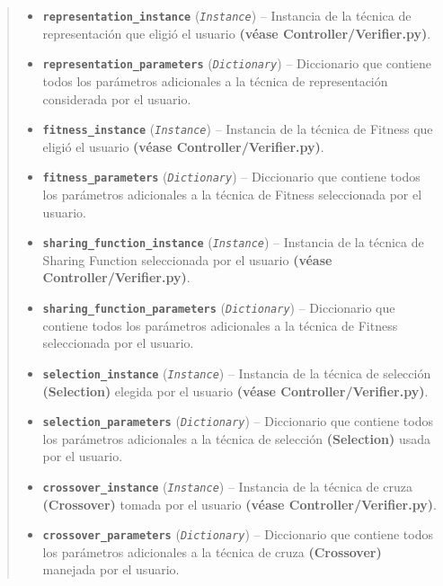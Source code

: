 \documentclass[letterpaper,10pt,english]{sphinxmanual}
\begin{document}
\begin{fulllineitems}
\begin{quote}
\begin{description}
\begin{itemize}
\item {} 
\textbf{\texttt{representation\_instance}} (\emph{\texttt{Instance}}) -- Instancia de la técnica de representación que eligió el usuario
\textbf{(véase Controller/Verifier.py)}.

\item {} 
\textbf{\texttt{representation\_parameters}} (\emph{\texttt{Dictionary}}) -- Diccionario que contiene todos los parámetros adicionales a la técnica
de representación considerada por el usuario.

\item {} 
\textbf{\texttt{fitness\_instance}} (\emph{\texttt{Instance}}) -- Instancia de la técnica de Fitness que eligió el usuario
\textbf{(véase Controller/Verifier.py)}.

\item {} 
\textbf{\texttt{fitness\_parameters}} (\emph{\texttt{Dictionary}}) -- Diccionario que contiene todos los parámetros adicionales a la técnica
de Fitness seleccionada por el usuario.

\item {} 
\textbf{\texttt{sharing\_function\_instance}} (\emph{\texttt{Instance}}) -- Instancia de la técnica de Sharing Function seleccionada por el usuario
\textbf{(véase Controller/Verifier.py)}.

\item {} 
\textbf{\texttt{sharing\_function\_parameters}} (\emph{\texttt{Dictionary}}) -- Diccionario que contiene todos los parámetros adicionales a la técnica
de Fitness seleccionada por el usuario.

\item {} 
\textbf{\texttt{selection\_instance}} (\emph{\texttt{Instance}}) -- Instancia de la técnica de selección \textbf{(Selection)} elegida por el usuario
\textbf{(véase Controller/Verifier.py)}.

\item {} 
\textbf{\texttt{selection\_parameters}} (\emph{\texttt{Dictionary}}) -- Diccionario que contiene todos los parámetros adicionales a la técnica
de selección \textbf{(Selection)} usada por el usuario.

\item {} 
\textbf{\texttt{crossover\_instance}} (\emph{\texttt{Instance}}) -- Instancia de la técnica de cruza \textbf{(Crossover)} tomada por el usuario
\textbf{(véase Controller/Verifier.py)}.

\item {} 
\textbf{\texttt{crossover\_parameters}} (\emph{\texttt{Dictionary}}) -- Diccionario que contiene todos los parámetros adicionales a la técnica
de cruza \textbf{(Crossover)} manejada por el usuario.


\end{itemize}
\end{description}
\end{quote}
\end{fulllineitems}
\end{document}
